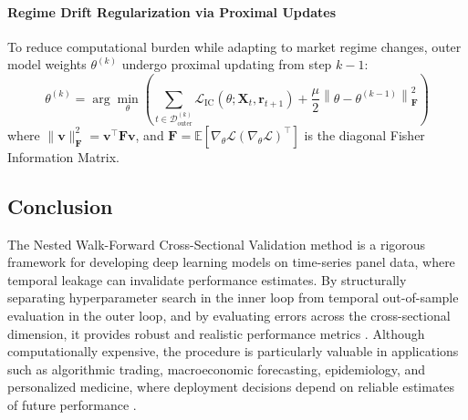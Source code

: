 \paragraph{Regime Drift Regularization via Proximal Updates}
To reduce computational burden while adapting to market regime changes, outer model weights $\theta^{(k)}$ undergo proximal updating from step $k-1$:
\begin{equation}
	\theta^{(k)} = \arg\min_{\theta} \left( \sum_{t \in \mathcal{D}_{\text{outer}}^{(k)}} \mathcal{L}_{\text{IC}}(\theta; \mathbf{X}_t, \mathbf{r}_{t+1}) + \dfrac{\mu}{2} \left\| \theta - \theta^{(k-1)} \right\|_{\mathbf{F}}^2 \right)
\end{equation}
where $\|\mathbf{v}\|_{\mathbf{F}}^2 = \mathbf{v}^\top \mathbf{F} \mathbf{v}$, and $\mathbf{F} = \mathbb{E}\left[ \nabla_\theta \mathcal{L} \left(\nabla_\theta \mathcal{L}\right)^\top \right]$ is the diagonal Fisher Information Matrix.

\subsection{Conclusion}
The Nested Walk-Forward Cross-Sectional Validation method is a rigorous framework for developing deep learning models on time-series panel data, where temporal leakage can invalidate performance estimates. By structurally separating hyperparameter search in the inner loop from temporal out-of-sample evaluation in the outer loop, and by evaluating errors across the cross-sectional dimension, it provides robust and realistic performance metrics \citep{cawley2010overfitting, pardo2008evaluation}. Although computationally expensive, the procedure is particularly valuable in applications such as algorithmic trading, macroeconomic forecasting, epidemiology, and personalized medicine, where deployment decisions depend on reliable estimates of future performance \citep{lopezdeprado2018advances, hyndman2021forecasting}.
